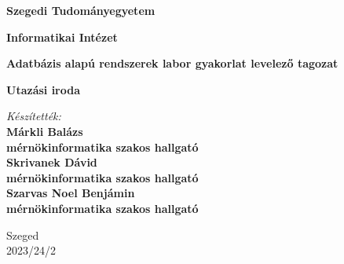 \begin{center}
    \vspace*{1cm}
    {\Large\bf Szegedi Tudományegyetem}

    \vspace{0.5cm}

    {\Large\bf Informatikai Intézet}

    \vspace{0.5cm}

    {\Large\bf Adatbázis alapú rendszerek labor gyakorlat levelező tagozat}

    \vspace*{3.0cm}

    {\LARGE\bf Utazási iroda}

    \vspace*{3.0cm}

    {\large
    \emph{Készítették:}\\
    \vspace{0.3cm}
    \bf{Márkli Balázs}\\
    mérnökinformatika szakos hallgató\\
    \vspace{0.3cm}
    \bf{Skrivanek Dávid}\\
    mérnökinformatika szakos hallgató\\
    \vspace{0.3cm}
    \bf{Szarvas Noel Benjámin}\\
    mérnökinformatika szakos hallgató\\
    }

    \vspace*{2.3cm}

    {\Large
    Szeged
    \\
    \vspace{2mm}
    2023/24/2
    }
\end{center}